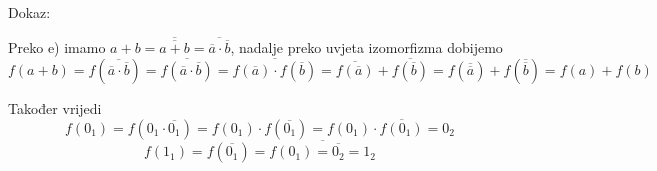 \documentclass{article}
\begin{document}
\begin{enumerate}
Dokaz:

Preko e) imamo $a + b = \overline{\overline{a + b}} = \overline{\overline{a}\cdot\overline{b}}$, nadalje preko uvjeta izomorfizma dobijemo
$$f(a+b) = f(\overline{\overline{a}\cdot\overline{b}}) = \overline{f(\overline{a}\cdot\overline{b})} = \overline{f(\overline{a})\cdot f(\overline{b})} = \overline{f(\overline{a})} + \overline{f(\overline{b})} = f(\overline{\overline{a}}) + f(\overline{\overline{b}}) = f(a) + f(b)$$

Također vrijedi $$f(0_1) = f(0_1\cdot\overline{0_1}) = f(0_1)\cdot f(\overline{0_1}) = f(0_1)\cdot \overline{f(0_1)} = 0_2$$
$$f(1_1) = f(\overline{0_1}) = \overline{f(0_1) = \overline{0_2} = 1_2}$$

\end{enumerate}
\end{document}
